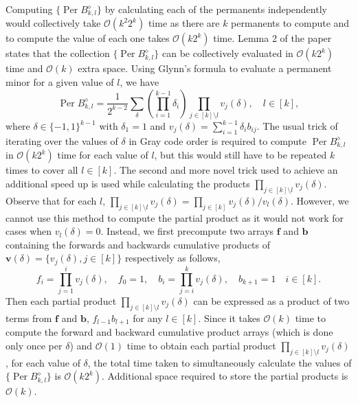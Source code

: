 \documentclass[ %
                    author={Manan Vaswani},
                supervisor={Dr. Raphael Clifford},
                    degree={MEng},
                     title={A multi-core CPU implementation of the classical Boson Sampling algorithm},
                  subtitle={},
                      type={},
                      year={2019} ]{dissertation}
\theoremstyle{plain}
\theoremstyle{definition}
\DeclareMathOperator*{\Per}{\mathrm{Per}}
\begin{document}
Computing $\{ \Per B_{k, l}^{\diamond} \}$ by calculating each of the permanents independently would collectively take $\mathcal{O}(k^2 2^k)$ time as there are $k$ permanents to compute and to compute the value of each one takes $\mathcal{O}(k 2^k)$ time. Lemma 2 of the paper states that the collection $\{ \Per B_{k, l}^{\diamond} \}$ can be collectively evaluated in $\mathcal{O}(k 2^k)$ time and $\mathcal{O}(k)$ extra space. Using Glynn's formula to evaluate a permanent minor for a given value of $l$, we have
\begin{equation}
\Per B_{k, l}^{\diamond} = \frac{1}{2^{k-2}} \sum_\delta \left( \prod_{i=1}^{k-1} \delta_i \right) \prod_{j \in [k] \setminus l} v_j (\delta), \quad l \in [k],
\end{equation}
where $\delta \in \{-1, 1\}^{k-1}$ with $\delta_1 = 1$ and $v_j (\delta) = \sum_{i=1}^{k-1} \delta_i b_{ij}$.
The usual trick of iterating over the values of $\delta$ in Gray code order is required to compute $\Per B_{k, l}^{\diamond}$ in $\mathcal{O}(k2^k)$ time for each value of $l$, but this would still have to be repeated $k$ times to cover all $l \in [k]$. The second and more novel trick used to achieve an additional speed up is used while calculating the products $\prod_{j \in [k] \setminus l} v_j (\delta)$. Observe that for each $l$, $\prod_{j \in [k] \setminus l} v_j (\delta) = \prod_{j \in [k]} v_j (\delta) / v_l(\delta)$. However, we cannot use this method to compute the partial product as it would not work for cases when $v_l(\delta) = 0$. Instead, we first precompute two arrays $\mathbf{f}$ and $\mathbf{b}$ containing the forwards and backwards cumulative products of $\mathbf{v}(\delta) = \{v_j(\delta), j\in [k]\}$ respectively as follows,
\begin{equation}
f_i = \prod_{j=1}^i v_j(\delta), \quad f_0 = 1,
\quad b_i = \prod_{j=i}^k v_j(\delta), \quad b_{k+1} = 1 \quad i \in [k].
\end{equation}
Then each partial product $\prod_{j \in [k] \setminus l} v_j (\delta)$ can be expressed as a product of two terms from $\mathbf{f}$ and $\mathbf{b}$, $f_{l-1} b_{l+1}$ for any $l \in [k]$. Since it takes $\mathcal{O}(k)$ time to compute the forward and backward cumulative product arrays (which is done only once per $\delta$) and $\mathcal{O}(1)$ time to obtain each partial product $\prod_{j \in [k] \setminus l} v_j (\delta)$, for each value of $\delta$, the total time taken to simultaneously calculate the values of $\{ \Per B_{k, l}^{\diamond} \}$ is $\mathcal{O}(k2^k)$. Additional space required to store the partial products is $\mathcal{O}(k)$.
\end{document}
